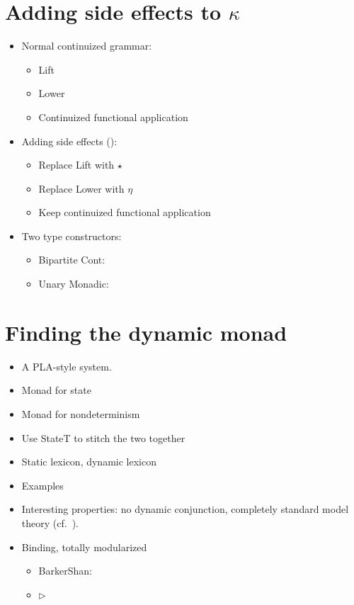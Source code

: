 \section{Adding side effects to $\kappa$}
\begin{itemize}
	\item Normal continuized grammar:
	\begin{itemize}
		\item Lift
		\item Lower
		\item Continuized functional application
	\end{itemize}

	\item Adding side effects (\citealt{Wadler:1994, Wadler:1995, Shan:2002}): 
	\begin{itemize}
		\item Replace Lift with $\star$
		\item Replace Lower with $\eta$
		\item Keep continuized functional application
	\end{itemize}

	\item Two type constructors:
	\begin{itemize}
		\item Bipartite Cont: 
		\item Unary Monadic: 
	\end{itemize}
	
\end{itemize}


\section{Finding the dynamic monad}

\begin{itemize}
	
	\item A PLA-style system.
	
	\item Monad for state
	
	\item Monad for nondeterminism
	
	\item Use StateT to stitch the two together

	\item Static lexicon, dynamic lexicon
	
	\item Examples
	
	\item Interesting properties: no dynamic conjunction, completely standard model theory (cf.~\citealt{Groote:2006}). %
	
	\item Binding, totally modularized
	\begin{itemize}
		\item BarkerShan:
		\item $\rhd$
	\end{itemize}
	
\end{itemize}

\section{}

\citealt{Groote:2001}
\citealt{Charlow:diss}

{\small}

